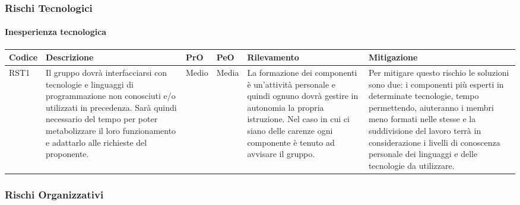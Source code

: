 \subsubsection{Rischi Tecnologici}
\paragraph{Inesperienza tecnologica}		
		\begin{center}
	\begin{longtable}{p{1cm}|p{4cm}|p{0.7cm}|p{0.7cm}|p{3cm}|p{4cm}}
		\arrayrulecolor{white}
		\hline
		\rowcolor{blue!20}
		\textbf{Codice} & 
		\textbf{Descrizione} &
		\textbf{PrO}  &
		\textbf{PeO}  &				        
		\textbf{Rilevamento} &
		\textbf{Mitigazione} \\
		\hline
		RST1 & Il gruppo dovrà interfacciarsi con tecnologie e linguaggi di programmazione non conosciuti e/o utilizzati in precedenza. Sarà quindi necessario del tempo per poter metabolizzare il loro funzionamento e adattarlo alle richieste del proponente. & Medio & Media & La formazione dei componenti è un'attività personale e quindi ognuno dovrà gestire in autonomia la propria istruzione. Nel caso in cui ci siano delle carenze ogni componente è tenuto ad avvisare il gruppo. & Per mitigare questo rischio le soluzioni sono due: i componenti più esperti in determinate tecnologie, tempo permettendo, aiuteranno i membri meno formati nelle stesse e la suddivisione del lavoro terrà in considerazione i livelli di conoscenza personale dei linguaggi e delle tecnologie da utilizzare. \\
		\end{longtable}
\end{center}		
		
\subsubsection{Rischi Organizzativi}
